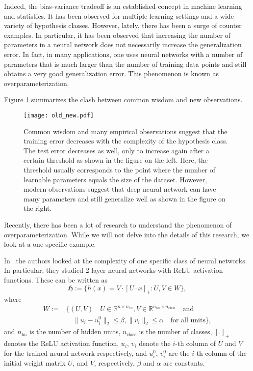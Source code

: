 Indeed, the bias-variance tradeoff is an established concept in machine learning
and statistics. It has been observed for multiple learning settings and a wide
variety of hypothesis classes. However, lately, there has been a surge of
counter examples. In particular, it has been observed that increasing the number
of parameters in a neural network does not necessarily increase the
generalization error. In fact, in many applications, one uses neural networks
with a number of parameters that is much larger than the number of training data
points and still obtains a very good generalization error. This phenomenon is
known as overparameterization.

Figure \cref{Fig:old_new} summarizes the clash between common wisdom and new observations.

\begin{figure}[htbp]
	\label{Fig:old_new}
		\centering
		\texttt{[image: old\_new.pdf]}
		\caption{Common wisdom and many empirical observations suggest that the training error decreases with the complexity of the hypothesis class. The test error decreases as well, only to increase again after a certain threshold as shown in the figure on the left. Here, the threshold usually corresponds to the point where the number of learnable parameters equals the size of the dataset. However, modern observations suggest that deep neural network can have many parameters and still generalize well as shown in the figure on the right.}
\end{figure}
Recently, there has been a lot of research to understand the phenomenon of
overparameterization. While we will not delve into the details of this research,
we look at a one specific example. 

In~\cite{Neyshabur:arXiv1805} the authors looked at the complexity of one
specific class of neural networks. In particular, they studied 2-layer neural
networks with ReLU activation functions. These can be written as
$$
	\mathfrak{H} := \{h(x) = V \cdot [U\cdot x]_+: U, V \in W\},
	$$
	where
	\begin{align*}
	W :=& \{(U,V) \quad U \in \mathbb{R}^{n \times n_{\text{hu}}}, V \in \mathbb{R}^{n_\text{hu} \times n_{\text{class}}} \quad \text{and}\\
	& \quad \|u_i-u_i^0\|_2 \leq \beta, \|v_i\|_2 \leq \alpha \quad \text{for all units}\}, 
	\end{align*}
	and $n_\text{hu}$ is the number of hidden units, $n_{\text{class}}$ is the
	number of classes, $[.]_+$ denotes the ReLU activation function, $u_i$,
	$v_i$ denote the $i$-th column of $U$ and $V$ for the trained neural
	network respectively, and $u_i^0$, $v_i^0$ are the $i$-th column of the
	initial weight matrix $U$, and $V$, respectively, $\beta$ and $\alpha$ are
	constants.
	
